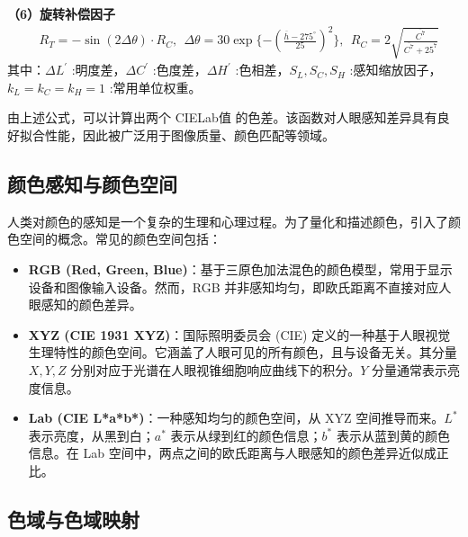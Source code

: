 \textbf{（6）旋转补偿因子}
\begin{equation}
\begin{aligned}
 &R_{T}=-\sin(2\Delta \theta)\cdot R_{C},\ \ \Delta \theta=30\exp\{-(\frac{\overline{h}-275^{\circ}}{25})^{2}\},\ \ R_{C}=2\sqrt{\frac{\overline{C^{7}}}{\overline{C^{7}}+25^{7}}}
\end{aligned}
\end{equation}
其中：$\Delta L^{'}$ :明度差，$\Delta C^{'}$ :色度差，$\Delta H^{'}$ :色相差，$S_{L},S_{C},S_{H}$ :感知缩放因子，$k_{L}=k_{C}=k_{H}=1$ :常用单位权重。

由上述公式，可以计算出两个 CIELab值 的色差。该函数对人眼感知差异具有良好拟合性能，因此被广泛用于图像质量、颜色匹配等领域。
\subsection[\hspace{-2pt}颜色感知与颜色空间]{{\heiti{} \hspace{-8pt}颜色感知与颜色空间}}\label{section2: 颜色感知与颜色空间}

人类对颜色的感知是一个复杂的生理和心理过程。为了量化和描述颜色，引入了颜色空间的概念。常见的颜色空间包括：

\begin{itemize}
    \item \textbf{RGB (Red, Green, Blue)}：基于三原色加法混色的颜色模型，常用于显示设备和图像输入设备。然而，RGB 并非感知均匀，即欧氏距离不直接对应人眼感知的颜色差异。
    \item \textbf{XYZ (CIE 1931 XYZ)}：国际照明委员会 (CIE) 定义的一种基于人眼视觉生理特性的颜色空间。它涵盖了人眼可见的所有颜色，且与设备无关。其分量 $X, Y, Z$ 分别对应于光谱在人眼视锥细胞响应曲线下的积分。$Y$ 分量通常表示亮度信息。
    \item \textbf{Lab (CIE L*a*b*)}：一种感知均匀的颜色空间，从 XYZ 空间推导而来。$L^*$ 表示亮度，从黑到白；$a^*$ 表示从绿到红的颜色信息；$b^*$ 表示从蓝到黄的颜色信息。在 Lab 空间中，两点之间的欧氏距离与人眼感知的颜色差异近似成正比。
\end{itemize}

\subsection[\hspace{-2pt}色域与色域映射]{{\heiti{} \hspace{-8pt}色域与色域映射}}\label{section2: 色域与色域映射}

